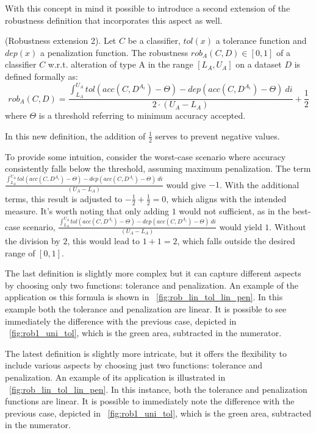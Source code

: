 With this concept in mind it possible to introduce a second extension of the robustness definition that incorporates this aspect as well.

\begin{definition}\label{def:rob2} (Robustness extension 2).
	Let $C$ be a classifier, $tol(x)$ a tolerance function and $dep(x)$ a penalization function.
	The robustness $rob_A(C,D) \in [0,1]$ of a classifier $C$ w.r.t. alteration of type A in the range $[L_A, U_A]$ on a dataset $D$ is defined formally as:
	\[
		rob_A(C,D) = \frac{\int_{L_A}^{U_A} tol(acc(C,D^{A_i}) - \Theta) - dep(acc(C,D^{A_i}) - \Theta)\ di}{2 \cdot (U_A - L_A)} + \frac{1}{2}
	\]
	where $\Theta$ is a threshold referring to minimum accuracy accepted.
\end{definition}

In this new definition, the addition of $\frac{1}{2}$ serves to prevent negative values.

To provide some intuition, consider the worst-case scenario where accuracy consistently falls below the threshold, assuming maximum penalization.
The term $\frac{\int_{L_A}^{U_A} tol(acc(C,D^{A_i}) - \Theta) - dep(acc(C,D^{A_i}) - \Theta)\ di}{(U_A - L_A)}$ would give $-1$.
With the additional terms, this result is adjusted to $-\frac{1}{2} + \frac{1}{2} = 0$, which aligns with the intended measure.
It's worth noting that only adding $1$ would not sufficient, as in the best-case scenario, $\frac{\int_{L_A}^{U_A} tol(acc(C,D^{A_i}) - \Theta) - dep(acc(C,D^{A_i}) - \Theta)\ di}{(U_A - L_A)}$ would yield $1$.
Without the division by $2$, this would lead to $1 + 1 = 2$, which falls outside the desired range of $[0, 1]$.

The last definition is slightly more complex but it can capture different aspects by choosing only two functions: tolerance and penalization. An example of the application os this formula is shown in \Fig~\ref{fig:rob_lin_tol_lin_pen}. In this example both the tolerance and penalization are linear. It is possible to see immediately the difference with the previous case, depicted in \Fig~\ref{fig:rob1_uni_tol}, which is the green area, subtracted in the numerator. 

The latest definition is slightly more intricate, but it offers the flexibility to include various aspects by choosing just two functions: tolerance and penalization. An example of its application is illustrated in \Fig~\ref{fig:rob_lin_tol_lin_pen}. In this instance, both the tolerance and penalization functions are linear. It is possible to immediately note the difference with the previous case, depicted in \Fig~\ref{fig:rob1_uni_tol}, which is the green area, subtracted in the numerator. 

